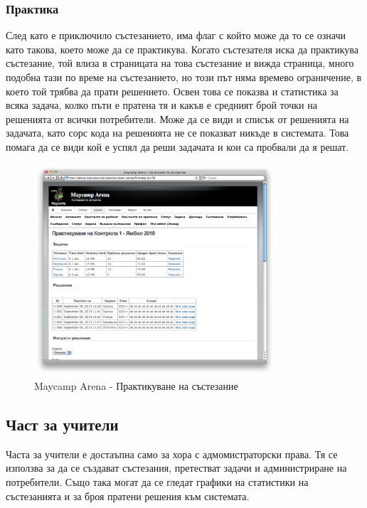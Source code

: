 \documentclass[a4paper,12pt]{article}
\begin{document}
  \subsubsection{Практика}
  
  След като е приключило състезанието, има флаг с който може да то се означи като такова, което може да се практикува. Когато състезателя иска да практикува състезание, той влиза в страницата на това състезание и вижда страница, много подобна тази по време на състезанието, но този път няма времево ограничение, в което той трябва да прати решението. Освен това се показва и статистика за всяка задача, колко пъти е пратена тя и какъв е средният брой точки на решенията от всички потребители. Може да се види и списък от решенията на задачата, като сорс кода на решенията не се показват никъде в системата. Това помага да се види кой е успял да реши задачата и кои са пробвали да я решат.

  \begin{figure}[ht]
    \begin{center}
      \includegraphics[width=0.8\textwidth]{maycamp_arena_practice.png}
    \end{center}
    \caption{Maycamp Arena - Практикуване на състезание}
    \label{arena_practice}
  \end{figure}
  
  \subsection{Част за учители}
  Часта за учители е достаъпна само за хора с адмомистраторски права. Тя се използва за да се създават състезания, претестват задачи и администриране на потребители. Също така могат да се гледат графики на статистики на състезанията и за броя пратени решения към системата.
  
\end{document}
